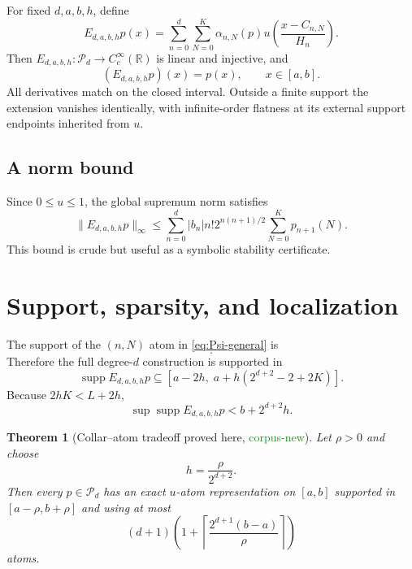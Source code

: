 \documentclass[11pt]{article}
\newtheorem{theorem}{Theorem}[section]
\theoremstyle{definition}
\theoremstyle{remark}
\DeclareMathOperator{\supp}{supp}
\newcommand{\R}{\mathbb{R}}
\newcommand{\Pp}{\mathcal{P}}
\newcommand{\1}{\mathbf{1}}
\newcommand{\CorpusNew}{\textcolor{ForestGreen}{\textsf{corpus-new}}}
\newcommand{\ProvedHere}{\textcolor{BrickRed}{\textsf{proved here}}}
\begin{document}
For fixed $d,a,b,h$, define
\begin{equation}
 E_{d,a,b,h}p(x)=
 \sum_{n=0}^{d}\sum_{N=0}^{K}
 \alpha_{n,N}(p)
 u\!\left(\frac{x-C_{n,N}}{H_n}\right).
 \label{eq:extension-operator}
\end{equation}
Then $E_{d,a,b,h}:\Pp_d\to C_c^\infty(\R)$ is linear and injective, and
\begin{equation}
 (E_{d,a,b,h}p)(x)=p(x),\qquad x\in[a,b].
 \label{eq:restriction-right-inverse}
\end{equation}
All derivatives match on the closed interval.  Outside a finite support the
extension vanishes identically, with infinite-order flatness at its external
support endpoints inherited from $u$.

\subsection{A norm bound}

Since $0\leq u\leq1$, the global supremum norm satisfies
\begin{equation}
 \|E_{d,a,b,h}p\|_{\infty}
 \leq\sum_{n=0}^{d}|b_n|n!2^{n(n+1)/2}
 \sum_{N=0}^{K}p_{n+1}(N).
 \label{eq:norm-bound}
\end{equation}
This bound is crude but useful as a symbolic stability certificate.

\section{Support, sparsity, and localization}

The support of the $(n,N)$ atom in \eqref{eq:Psi-general} is
\begin{equation}
 [a-2h+2hN,\;a+h(2^{n+2}-2+2N)].
 \label{eq:support-nN}
\end{equation}
Therefore the full degree-$d$ construction is supported in
\begin{equation}
 \supp E_{d,a,b,h}p
 \subseteq
 [a-2h,\;a+h(2^{d+2}-2+2K)].
 \label{eq:support-total}
\end{equation}
Because $2hK<L+2h$,
\begin{equation}
 \sup\supp E_{d,a,b,h}p<b+2^{d+2}h.
 \label{eq:support-simple}
\end{equation}

\begin{theorem}[Collar--atom tradeoff \ProvedHere, \CorpusNew]
\label{thm:collar}
Let $\rho>0$ and choose
\begin{equation}
 h=\frac{\rho}{2^{d+2}}.
 \label{eq:h-collar}
\end{equation}
Then every $p\in\Pp_d$ has an exact $u$-atom representation on $[a,b]$
supported in $[a-\rho,b+\rho]$ and using at most
\begin{equation}
 (d+1)\left(
 1+\left\lceil\frac{2^{d+1}(b-a)}{\rho}\right\rceil
 \right)
 \label{eq:collar-count}
\end{equation}
atoms.
\end{theorem}
\end{document}
